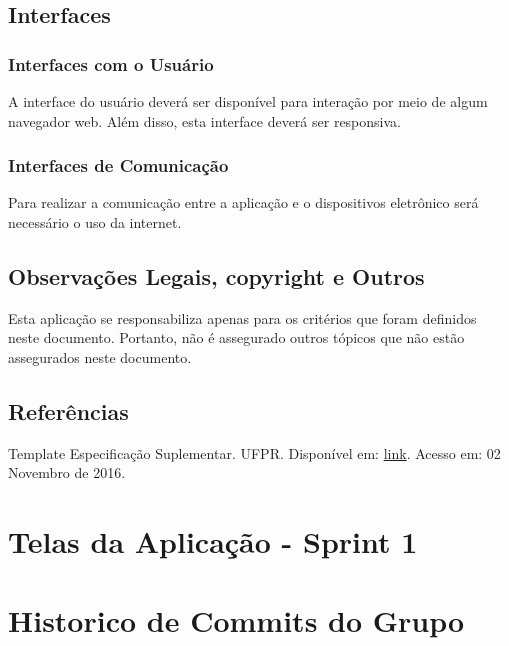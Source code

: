 \begin{apendicesenv}
{\large {\section { Interfaces \\ } } }

{\subsection {Interfaces com o Usuário\\ }}

A interface do usuário deverá ser disponível para interação por meio de algum navegador web. Além disso, esta interface deverá ser responsiva.\\

{\subsection {Interfaces de Comunicação\\ }}

Para realizar a comunicação entre a aplicação e o dispositivos eletrônico será necessário o uso da internet.\\

{\large {\section { Observações Legais, copyright e Outros  \\ } } }

Esta aplicação se responsabiliza apenas para os critérios que foram definidos neste documento. Portanto, não é assegurado outros tópicos que não estão assegurados neste documento. \\

{\large {\section { Referências \\ } } }

Template Especificação Suplementar. UFPR. Disponível em: \href{http://www.funpar.ufpr.br:8080/rup/webtmpl/templates/req/rup_sspec.htm}{link}. Acesso em: 02 Novembro de 2016.\\

\chapter{Telas da Aplicação - Sprint 1}

\chapter{Historico de Commits do Grupo}

\end{apendicesenv}
